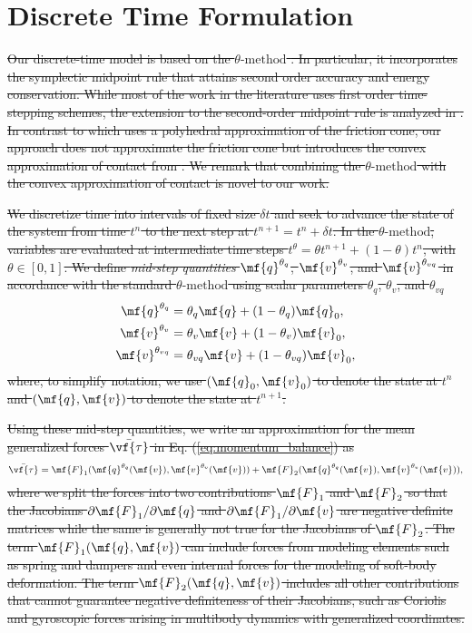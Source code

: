 \section{Discrete Time Formulation}
\label{sec:discrete_time_formulation}

\sout{Our discrete-time model is based on the $\theta\text{-method}$ \cite[\S
II.7]{bib:hairer2008solving}. In particular, it incorporates the symplectic
midpoint rule that attains second order accuracy and energy conservation. While
most of the work in the literature uses first order time-stepping schemes, the
extension to the second-order midpoint rule is analyzed in
\cite{bib:potra2006linearly}. In contrast to \cite{bib:potra2006linearly} which
uses a polyhedral approximation of the friction cone, our approach does not
approximate the friction cone but introduces the convex approximation of contact
from \cite{bib:anitescu2006}. We remark that combining the
$\theta\text{-method}$ with the convex approximation of contact is novel to our
work. }

\sout{We discretize time into intervals of fixed size $\delta t$ and seek to advance
the state of the system from time $t^n$ to the next step at $t^{n+1} = t^n +
\delta t$. In the $\theta\text{-method}$, variables are evaluated at
intermediate time steps $t^\theta = \theta t^{n+1}+(1-\theta)t^{n}$, with
$\theta \in [0, 1]$. We define \emph{mid-step quantities} $\mf{q}^{\theta_{q}}$,
$\mf{v}^{\theta_{v}}$, and $\mf{v}^{\theta_{vq}}$ in accordance with the
standard $\theta\text{-method}$ using scalar parameters $\theta_q$, $\theta_v$,
and $\theta_{vq}$}
\begin{align}
	\mf{q}^{\theta_q} &= \theta_q\mf{q} + (1-\theta_{q})\mf{q}_0,\nonumber\\
	\mf{v}^{\theta_v} &= \theta_v\mf{v} + (1-\theta_v)\mf{v}_0,\nonumber\\
	\mf{v}^{\theta_{vq}} &= \theta_{vq}\mf{v} + (1-\theta_{vq})\mf{v}_0,
	\label{eq:theta_method}
\end{align}
\sout{where, to simplify notation, we use $(\mf{q}_0, \mf{v}_0)$ to denote the state
at $t^n$ and $(\mf{q}, \mf{v})$ to denote the state at $t^{n+1}$.}

\sout{Using these mid-step quantities, we write an approximation for the mean
generalized forces $\bar{\vf{\tau}}$ in Eq. (\ref{eq:momentum_balance}) as}
\begin{equation*}
	\bar{\vf{\tau}} = \mf{F}_1(\mf{q}^{\theta_{q}}(\mf{v}), \mf{v}^{\theta_v}(\mf{v}))+
	\mf{F}_2(\mf{q}^{\theta_{q}}(\mf{v}), \mf{v}^{\theta_v}(\mf{v})),
\end{equation*}
\sout{where we split the forces into two contributions $\mf{F}_1$ and $\mf{F}_2$ so
that the Jacobians $\partial \mf{F}_1/\partial\mf{q}$ and $\partial
\mf{F}_1/\partial\mf{v}$ are negative definite matrices while the same is
generally not true for the Jacobians of $\mf{F}_2$. The term $\mf{F}_1(\mf{q},
\mf{v})$ can include forces from modeling elements such as spring and dampers
and even internal forces for the modeling of soft-body deformation. The term
$\mf{F}_2(\mf{q}, \mf{v})$ includes all other contributions that cannot
guarantee negative definiteness of their Jacobians, such as Coriolis and
gyroscopic forces arising in multibody dynamics with generalized coordinates.}

